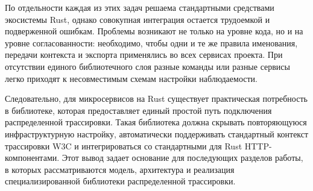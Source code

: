По отдельности каждая из этих задач решаема стандартными средствами
экосистемы Rust, однако совокупная интеграция остается трудоемкой и подверженной
ошибкам. Проблемы возникают не только на уровне кода, но и на уровне
согласованности: необходимо, чтобы одни и те же правила именования, передачи
контекста и экспорта применялись во всех сервисах проекта. При отсутствии единого
библиотечного слоя разные команды или разные сервисы легко приходят к
несовместимым схемам настройки наблюдаемости.

Следовательно, для микросервисов на Rust существует практическая потребность в
библиотеке, которая предоставляет единый простой путь подключения распределенной
трассировки. Такая библиотека должна скрывать повторяющуюся инфраструктурную
настройку, автоматически поддерживать стандартный контекст трассировки W3C и интегрироваться со
стандартными для Rust HTTP-компонентами. Этот вывод задает основание для
последующих разделов работы, в которых рассматриваются модель, архитектура и
реализация специализированной библиотеки распределенной трассировки.
